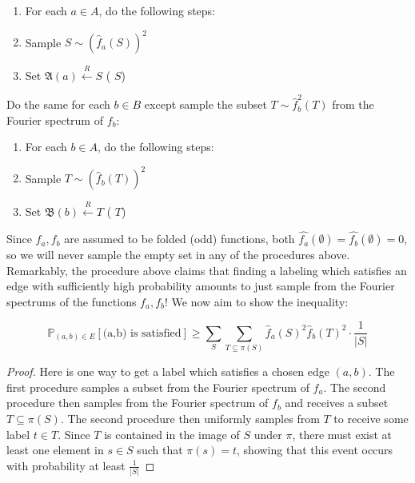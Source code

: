 \begin{enumerate}
    \item For each $a \in A$, do the following steps:
    \item Sample $S \sim (\widehat{f}_a(S))^2$
    \item Set $\mathfrak{A}(a) \xleftarrow{R} S$ \quad ( $S$)
\end{enumerate}

Do the same for each $b \in B$ except sample the subset $T \sim \widehat{f}_b^2(T)$ from the Fourier spectrum of $f_b$:

\begin{enumerate}
    \item For each $b \in A$, do the following steps:
    \item Sample $T \sim (\widehat{f}_b(T))^2$
    \item Set $\mathfrak{B}(b) \xleftarrow{R} T$ \quad ( $T$)
\end{enumerate}


 Since $f_a,f_b$ are assumed to be folded (odd) functions, both $\widehat{f_a}(\emptyset) = \widehat{f_b}(\emptyset) = 0$, so we will never sample the empty set in any of the procedures above. Remarkably, the procedure above claims that finding a labeling which satisfies an edge with  sufficiently high probability amounts to just sample from the Fourier spectrums of the functions $f_a,f_b$! We now aim to show the inequality:

\begin{lemma} \label{firststepsoundness}
  \begin{equation}
      \mathbb{P}_{(a,b) \in E}[ \text{(a,b) is satisfied}] \geq \sum_{S} \sum_{T \subseteq \pi(S)} \widehat{f}_a(S)^2\widehat{f}_b(T)^2 \cdot \frac{1}{|S|}
  \end{equation}
\end{lemma}
\begin{proof}
  Here is one way to get a label which satisfies a chosen edge $(a,b)$. The first procedure samples a subset from the Fourier spectrum of $f_a$. The second procedure then samples from the Fourier spectrum of $f_b$ and receives a subset $T \subseteq \pi(S)$. The second procedure then uniformly samples from $T$ to receive some label $t \in T$. Since $T$ is contained in the image of $S$ under $\pi$, there must exist at least one element in $s \in S$ such that $\pi(s) = t$, showing that this event occurs with probability at least $\frac{1}{|S|}$
\end{proof}

